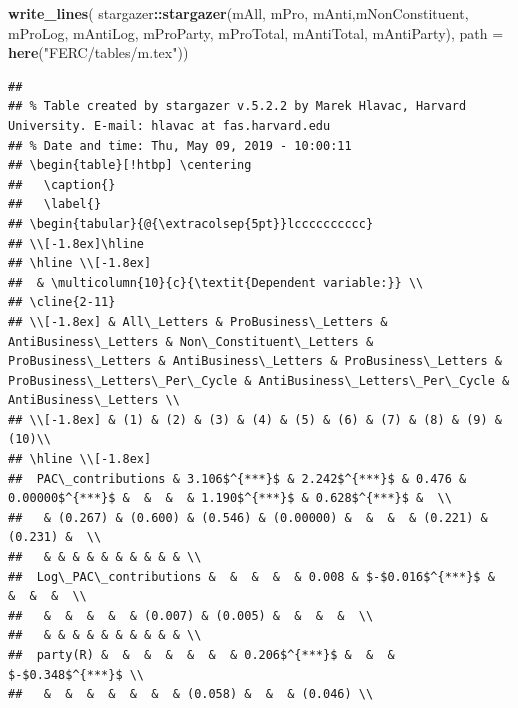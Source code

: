 \documentclass[]{article}
\newenvironment{Shaded}{\begin{snugshade}}{\end{snugshade}}
\newcommand{\KeywordTok}[1]{\textcolor[rgb]{0.13,0.29,0.53}{\textbf{#1}}}
\newcommand{\DataTypeTok}[1]{\textcolor[rgb]{0.13,0.29,0.53}{#1}}
\newcommand{\StringTok}[1]{\textcolor[rgb]{0.31,0.60,0.02}{#1}}
\newcommand{\OperatorTok}[1]{\textcolor[rgb]{0.81,0.36,0.00}{\textbf{#1}}}
\newcommand{\NormalTok}[1]{#1}
\begin{document}
\begin{Shaded}
\begin{Highlighting}[]
\KeywordTok{write_lines}\NormalTok{(}
\NormalTok{  stargazer}\OperatorTok{::}\KeywordTok{stargazer}\NormalTok{(mAll, mPro, mAnti,mNonConstituent, mProLog, mAntiLog, mProParty, mProTotal, mAntiTotal, mAntiParty),}
  \DataTypeTok{path =} \KeywordTok{here}\NormalTok{(}\StringTok{"FERC/tables/m.tex"}\NormalTok{))}
\end{Highlighting}
\end{Shaded}

\begin{verbatim}
## 
## % Table created by stargazer v.5.2.2 by Marek Hlavac, Harvard University. E-mail: hlavac at fas.harvard.edu
## % Date and time: Thu, May 09, 2019 - 10:00:11
## \begin{table}[!htbp] \centering 
##   \caption{} 
##   \label{} 
## \begin{tabular}{@{\extracolsep{5pt}}lcccccccccc} 
## \\[-1.8ex]\hline 
## \hline \\[-1.8ex] 
##  & \multicolumn{10}{c}{\textit{Dependent variable:}} \\ 
## \cline{2-11} 
## \\[-1.8ex] & All\_Letters & ProBusiness\_Letters & AntiBusiness\_Letters & Non\_Constituent\_Letters & ProBusiness\_Letters & AntiBusiness\_Letters & ProBusiness\_Letters & ProBusiness\_Letters\_Per\_Cycle & AntiBusiness\_Letters\_Per\_Cycle & AntiBusiness\_Letters \\ 
## \\[-1.8ex] & (1) & (2) & (3) & (4) & (5) & (6) & (7) & (8) & (9) & (10)\\ 
## \hline \\[-1.8ex] 
##  PAC\_contributions & 3.106$^{***}$ & 2.242$^{***}$ & 0.476 & 0.00000$^{***}$ &  &  &  & 1.190$^{***}$ & 0.628$^{***}$ &  \\ 
##   & (0.267) & (0.600) & (0.546) & (0.00000) &  &  &  & (0.221) & (0.231) &  \\ 
##   & & & & & & & & & & \\ 
##  Log\_PAC\_contributions &  &  &  &  & 0.008 & $-$0.016$^{***}$ &  &  &  &  \\ 
##   &  &  &  &  & (0.007) & (0.005) &  &  &  &  \\ 
##   & & & & & & & & & & \\ 
##  party(R) &  &  &  &  &  &  & 0.206$^{***}$ &  &  & $-$0.348$^{***}$ \\ 
##   &  &  &  &  &  &  & (0.058) &  &  & (0.046) \\ 

\end{verbatim}
\end{document}
